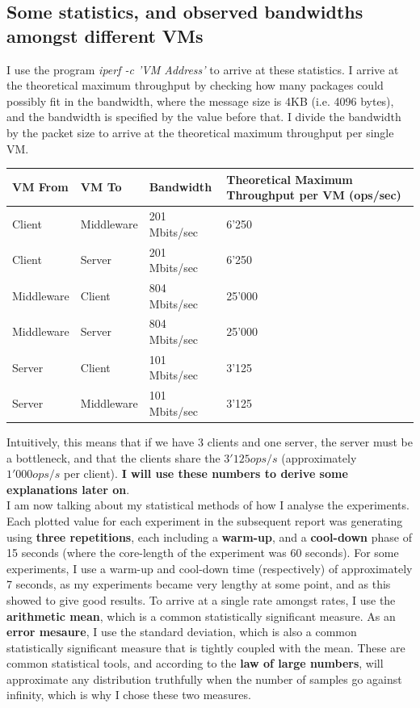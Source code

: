 \documentclass[11pt,a4paper]{article}
\begin{document}
\subsection{Some statistics, and observed bandwidths amongst different VMs}
I use the program \textit{iperf -c 'VM Address'} to arrive at these statistics.
I arrive at the theoretical maximum throughput by checking how many packages could possibly fit in the bandwidth, where the message size is 4KB (i.e. 4096 bytes), and the bandwidth is specified by the value before that.
I divide the bandwidth by the packet size to arrive at the theoretical maximum throughput per single VM.

\begin{center}
    \begin{tabular}{| l | l | l | l |}
    \hline
    VM From & VM To & Bandwidth & Theoretical Maximum Throughput per VM (ops/sec)\\ \hline
    Client & Middleware & 201 Mbits/sec &  6'250 \\ \hline
    Client & Server & 201 Mbits/sec & 6'250 \\ \hline
    Middleware & Client & 804 Mbits/sec & 25'000 \\ \hline
    Middleware & Server & 804 Mbits/sec & 25'000 \\ \hline
    Server & Client & 101 Mbits/sec &  3'125 \\ \hline
    Server & Middleware & 101 Mbits/sec & 3'125 \\
    \hline
    \end{tabular}
\end{center}

Intuitively, this means that if we have 3 clients and one server, the server must be a bottleneck, and that the clients share the $3'125 ops/s$ (approximately $1'000ops/s$ per client).
\textbf{I will use these numbers to derive some explanations later on}.\\

I am now talking about my statistical methods of how I analyse the experiments.
Each plotted value for each experiment in the subsequent report was generating using \textbf{three repetitions}, each including a \textbf{warm-up}, and a \textbf{cool-down} phase of 15 seconds (where the core-length of the experiment was 60 seconds).
For some experiments, I use a warm-up and cool-down time (respectively) of approximately 7 seconds, as my experiments became very lengthy at some point, and as this showed to give good results.
To arrive at a single rate amongst rates, I use the \textbf{arithmetic mean}, which is a common statistically significant measure.
As an \textbf{error mesaure}, I use the standard deviation, which is also a common statistically significant measure that is tightly coupled with the mean.
These are common statistical tools, and according to the \textbf{law of large numbers}, will approximate any distribution truthfully when the number of samples go against infinity, which is why I chose these two measures.
\end{document}
